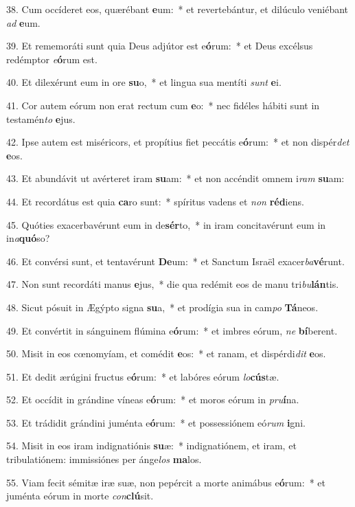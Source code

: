 38. Cum occíderet eos, quærébant \textbf{e}um:~*  et revertebántur, et dilúculo veniébant \textit{ad} \textbf{e}um.\

39. Et rememoráti sunt quia Deus adjútor est e\textbf{ó}rum:~*  et Deus excélsus redémptor \textit{e}\textbf{ó}rum est.\

40. Et dilexérunt eum in ore \textbf{su}o,~*  et lingua sua mentíti \textit{sunt} \textbf{e}i.\

41. Cor autem eórum non erat rectum cum \textbf{e}o:~*  nec fidéles hábiti sunt in testamén\textit{to} \textbf{e}jus.\

42. Ipse autem est miséricors, et propítius fiet peccátis e\textbf{ó}rum:~*  et non dispér\textit{det} \textbf{e}os.\

43. Et abundávit ut avérteret iram \textbf{su}am:~*  et non accéndit omnem i\textit{ram} \textbf{su}am:\

44. Et recordátus est quia \textbf{ca}ro sunt:~*  spíritus vadens et \textit{non} \textbf{réd}iens.\

45. Quóties exacerbavérunt eum in de\textbf{sér}to,~*  in iram concitavérunt eum in in\textit{a}\textbf{quó}so?\

46. Et convérsi sunt, et tentavérunt \textbf{De}um:~*  et Sanctum Israël exacer\textit{ba}\textbf{vé}runt.\

47. Non sunt recordáti manus \textbf{e}jus,~*  die qua redémit eos de manu tri\textit{bu}\textbf{lán}tis.\

48. Sicut pósuit in Ægýpto signa \textbf{su}a,~*  et prodígia sua in cam\textit{po} \textbf{Tá}neos.\

49. Et convértit in sánguinem flúmina e\textbf{ó}rum:~*  et imbres eórum, \textit{ne} \textbf{bí}berent.\

50. Misit in eos cœnomyíam, et comédit \textbf{e}os:~*  et ranam, et dispérdi\textit{dit} \textbf{e}os.\

51. Et dedit ærúgini fructus e\textbf{ó}rum:~*  et labóres eórum \textit{lo}\textbf{cús}tæ.\

52. Et occídit in grándine víneas e\textbf{ó}rum:~*  et moros eórum in \textit{pru}\textbf{í}na.\

53. Et trádidit grándini juménta e\textbf{ó}rum:~*  et possessiónem eó\textit{rum} \textbf{i}gni.\

54. Misit in eos iram indignatiónis \textbf{su}æ:~*  indignatiónem, et iram, et tribulatiónem: immissiónes per ánge\textit{los} \textbf{ma}los.\

55. Viam fecit sémitæ iræ suæ, non pepércit a morte animábus e\textbf{ó}rum:~*  et juménta eórum in morte \textit{con}\textbf{clú}sit.\

